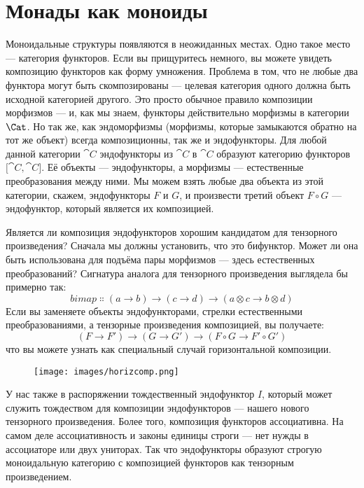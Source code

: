 \section{Монады как моноиды}

Моноидальные структуры появляются в неожиданных местах. Одно такое место ---
категория функторов. Если вы прищуритесь немного, вы можете увидеть
композицию функторов как форму умножения. Проблема в том, что не
любые два функтора могут быть скомпозированы --- целевая категория одного должна
быть исходной категорией другого. Это просто обычное правило
композиции морфизмов --- и, как мы знаем, функторы действительно
морфизмы в категории $\Cat$. Но так же, как эндоморфизмы
(морфизмы, которые замыкаются обратно на тот же объект) всегда композиционны, так же
и эндофункторы. Для любой данной категории $\cat{C}$ эндофункторы из
$\cat{C}$ в $\cat{C}$ образуют категорию функторов ${[}\cat{C}, \cat{C}{]}$. Её
объекты --- эндофункторы, а морфизмы --- естественные преобразования
между ними. Мы можем взять любые два объекта из этой категории, скажем,
эндофункторы $F$ и $G$, и произвести третий объект $F \circ G$ ---
эндофунктор, который является их композицией.

Является ли композиция эндофункторов хорошим кандидатом для тензорного произведения? Сначала
мы должны установить, что это бифунктор. Может ли она быть использована для подъёма
пары морфизмов --- здесь естественных преобразований? Сигнатура
аналога  для тензорного произведения выглядела бы примерно
так:
\[\mathit{bimap} \Colon (a \to b) \to (c \to d) \to (a \otimes c \to b \otimes d)\]
Если вы заменяете объекты эндофункторами, стрелки естественными
преобразованиями, а тензорные произведения композицией, вы получаете:
\[(F \to F') \to (G \to G') \to (F \circ G \to F' \circ G')\]
что вы можете узнать как специальный случай горизонтальной композиции.

\begin{figure}[H]
  \centering
  \texttt{[image: images/horizcomp.png]}
\end{figure}

\noindent
У нас также в распоряжении тождественный эндофунктор $I$, который
может служить тождеством для композиции эндофункторов --- нашего нового тензорного
произведения. Более того, композиция функторов ассоциативна. На самом деле
ассоциативность и законы единицы строги --- нет нужды в
ассоциаторе или двух униторах. Так что эндофункторы образуют строгую моноидальную
категорию с композицией функторов как тензорным произведением.

